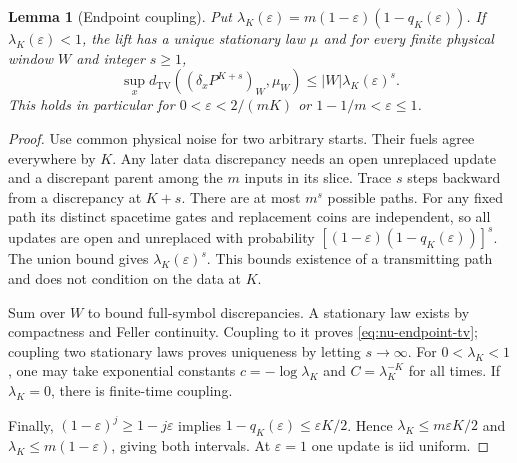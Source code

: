 \documentclass[11pt]{article}
\theoremstyle{plain}
\newtheorem{lemma}[theorem]{Lemma}
\theoremstyle{definition}
\theoremstyle{remark}
\newcommand{\eps}{\varepsilon}
\newcommand{\dtv}{d_{\mathrm{TV}}}
\begin{document}
\begin{lemma}[Endpoint coupling]\label{lem:nu-endpoints}
Put $\lambda_K(\eps)=m(1-\eps)(1-q_K(\eps))$. If $\lambda_K(\eps)<1$, the lift has a unique stationary law $\mu$ and for every finite physical window $W$ and integer $s\ge1$,
\begin{equation}\label{eq:nu-endpoint-tv}
 \sup_x\dtv((\delta_xP^{K+s})_W,\mu_W)
 \le |W|\lambda_K(\eps)^s.
\end{equation}
This holds in particular for $0<\eps<2/(mK)$ or $1-1/m<\eps\le1$.
\end{lemma}

\begin{proof}
Use common physical noise for two arbitrary starts. Their fuels agree everywhere by $K$. Any later data discrepancy needs an open unreplaced update and a discrepant parent among the $m$ inputs in its slice. Trace $s$ steps backward from a discrepancy at $K+s$. There are at most $m^s$ possible paths. For any fixed path its distinct spacetime gates and replacement coins are independent, so all updates are open and unreplaced with probability $[(1-\eps)(1-q_K(\eps))]^s$. The union bound gives $\lambda_K(\eps)^s$. This bounds existence of a transmitting path and does not condition on the data at $K$.

Sum over $W$ to bound full-symbol discrepancies. A stationary law exists by compactness and Feller continuity. Coupling to it proves \eqref{eq:nu-endpoint-tv}; coupling two stationary laws proves uniqueness by letting $s\to\infty$. For $0<\lambda_K<1$, one may take exponential constants $c=-\log\lambda_K$ and $C=\lambda_K^{-K}$ for all times. If $\lambda_K=0$, there is finite-time coupling.

Finally, $(1-\eps)^j\ge1-j\eps$ implies $1-q_K(\eps)\le\eps K/2$. Hence $\lambda_K\le m\eps K/2$ and $\lambda_K\le m(1-\eps)$, giving both intervals. At $\eps=1$ one update is iid uniform.
\end{proof}
\end{document}
